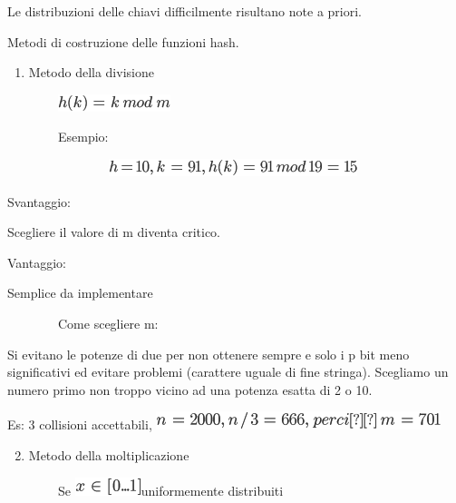 \documentclass{article}
\providecommand{\tightlist}{%
  \setlength{\itemsep}{0pt}\setlength{\parskip}{0pt}}
\begin{document}
{Le distribuzioni delle chiavi difficilmente risultano note a priori. }

{}

{}

{}

{Metodi di costruzione delle funzioni hash.}

{}

\begin{enumerate}
\tightlist
\item
  {Metodo della divisione}
\end{enumerate}

{}

{~~~~~~~~}\includegraphics{images/image255.png}

{~~~~~~~~Esempio: }

{~~~~~~~~~~~~~~~~}\includegraphics{images/image256.png}

{}

{Svantaggio: }

{Scegliere il valore di m diventa critico. }

{}

{Vantaggio:}

{Semplice da implementare}

{}

{~~~~~~~~Come scegliere m:}

{Si evitano le potenze di due per non ottenere sempre e solo i p bit
meno significativi ed evitare problemi (carattere uguale di fine
stringa). Scegliamo un numero primo non troppo vicino ad una potenza
esatta di 2 o 10.}

{Es: 3 collisioni accettabili, }\includegraphics{images/image257.png}

{}

{}

\begin{enumerate}
\setcounter{enumi}{1}
\tightlist
\item
  {Metodo della moltiplicazione}
\end{enumerate}

{}

{~~~~~~~~Se }\includegraphics{images/image258.png}{uniformemente
distribuiti}
\end{document}
